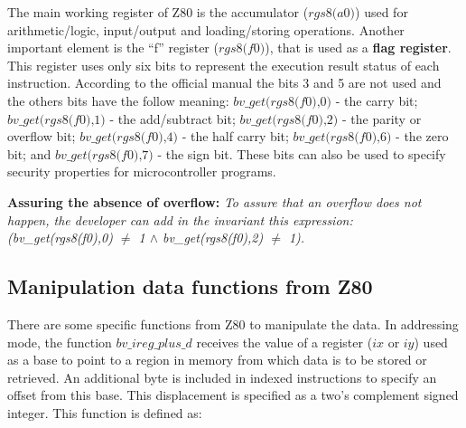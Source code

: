 \documentclass[a4paper]{llncs}
\begin{document}
The main working register of Z80 is the accumulator ($\textit{rgs8(a0)}$) used for arithmetic/logic, input/output and loading/storing operations.
Another important element is the ``f'' register ($\textit{rgs8(f0)}$),  that is
used as a \textbf{flag register}. This register uses only six bits to represent the execution result status of each instruction.
According to the official manual the bits 3 and 5 are not used and the others bits have the follow meaning: $\textit{bv\_get(rgs8(f0),0)}$ - the carry bit; $\textit{bv\_get(rgs8(f0),1)}$ - the add/subtract bit; $\textit{bv\_get(rgs8(f0),2)}$ - the parity or overflow bit; $\textit{bv\_get(rgs8(f0),4)}$ - the half carry bit; $\textit{bv\_get(rgs8(f0),6)}$ - the zero bit; and $\textit{bv\_get(rgs8(f0),7)}$ - the sign bit.
These bits can also be used to specify security properties for microcontroller programs.   

\textbf{Assuring the absence of overflow:}
 \emph{To assure that an overflow does not happen, the developer can add in the invariant this 
 expression:\\(\textit{bv\_get(rgs8(f0),0)} $\neq$ 1 $\land$
 \textit{bv\_get(rgs8(f0),2) $\neq$ 1}).
}

\subsection{Manipulation data functions from Z80}

 There are some specific functions from Z80 to manipulate the data. In addressing mode, the function
$\textit{bv\_ireg\_plus\_d}$ receives the value of a register ($\textit{ix}$ or $\textit{iy}$) 
used as a base to point to a region in memory from which data is to be stored or retrieved.
 An additional byte is included in indexed instructions to specify an offset from this base. This displacement is specified as a two's complement signed integer. This function is defined as:\\
\end{document}
